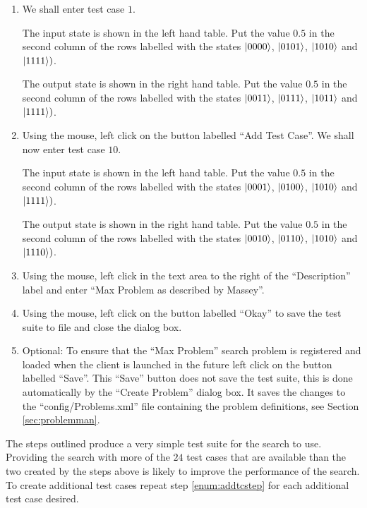 \begin{enumerate}
\item We shall enter test case $1$.

The input state is shown in the left hand table.
Put the value $0.5$ in the second column of the rows labelled with the states $\left\vert{0000}\right\rangle$, $\left\vert{0101}\right\rangle$, $\left\vert{1010}\right\rangle$ and $\left\vert{1111}\right\rangle)$.

The output state is shown in the right hand table.
Put the value $0.5$ in the second column of the rows labelled with the states $\left\vert{0011}\right\rangle$, $\left\vert{0111}\right\rangle$, $\left\vert{1011}\right\rangle$ and $\left\vert{1111}\right\rangle)$.

\item \label{enum:addtcstep} Using the mouse, left click on the button labelled ``Add Test Case''.
We shall now enter test case $10$.

The input state is shown in the left hand table.
Put the value $0.5$ in the second column of the rows labelled with the states $\left\vert{0001}\right\rangle$, $\left\vert{0100}\right\rangle$, $\left\vert{1010}\right\rangle$ and $\left\vert{1111}\right\rangle)$.

The output state is shown in the right hand table.
Put the value $0.5$ in the second column of the rows labelled with the states $\left\vert{0010}\right\rangle$, $\left\vert{0110}\right\rangle$, $\left\vert{1010}\right\rangle$ and $\left\vert{1110}\right\rangle)$.

\item Using the mouse, left click in the text area to the right of the ``Description'' label and enter ``Max Problem as described by Massey''.

\item Using the mouse, left click on the button labelled ``Okay'' to save the test suite to file and close the dialog box.

\item \label{enum:createsaveprobs}Optional: To ensure that the ``Max Problem'' search problem is registered and loaded when the client is launched in the future left click on the button labelled ``Save''.
This ``Save'' button does not save the test suite, this is done automatically by the ``Create Problem'' dialog box.
It saves the changes to the ``config/Problems.xml'' file containing the problem definitions, see Section \ref{sec:problemman}.
\end{enumerate}

The steps outlined produce a very simple test suite for the search to use.
Providing the search with more of the $24$ test cases that are available than the two created by the steps above is likely to improve the performance of the search.
To create additional test cases repeat step \ref{enum:addtcstep} for each additional test case desired.

